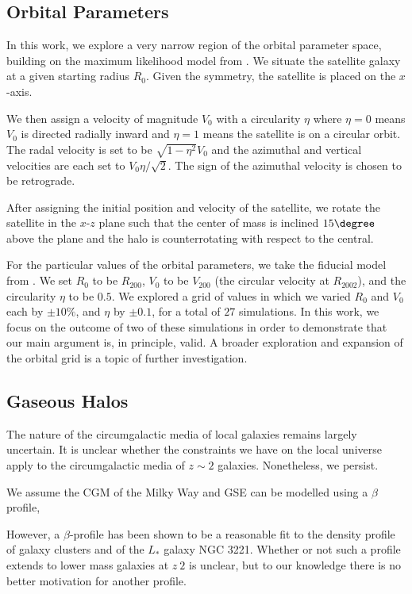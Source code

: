 \subsection{Orbital Parameters}\label{ssec:orbits}
In this work, we explore a very narrow region of the orbital parameter space, building on the maximum likelihood model from \citet{2021ApJ...923...92N}. We situate the satellite galaxy at a given starting radius $R_0$. Given the symmetry, the satellite is placed on the $x$-axis. 

We then assign a velocity of magnitude $V_0$ with a circularity $\eta$ where $\eta=0$ means $V_0$ is directed radially inward and $\eta=1$ means the satellite is on a circular orbit. The radal velocity is set to be $\sqrt{1-\eta^2}V_0$ and the azimuthal and vertical velocities are each set to $V_0 \eta / \sqrt{2}$. The sign of the azimuthal velocity is chosen to be retrograde.

After assigning the initial position and velocity of the satellite, we rotate the satellite in the $x$-$z$ plane such that the center of mass is inclined $15\degree$ above the plane and the halo is counterrotating with respect to the central.

For the particular values of the orbital parameters, we take the fiducial model from \citet{2021ApJ...923...92N}. We set $R_0$ to be $R_{200}$, $V_0$ to be $V_{200}$ (the circular velocity at $R_{2002}$), and the circularity $\eta$ to be $0.5$. We explored a grid of values in which we varied $R_0$ and $V_0$ each by $\pm10\%$, and $\eta$ by $\pm0.1$, for a total of $27$ simulations. In this work, we focus on the outcome of two of these simulations in order to demonstrate that our main argument is, in principle, valid. A broader exploration and expansion of the orbital grid is a topic of further investigation.

\subsection{Gaseous Halos}\label{ssec:gashalo}

The nature of the circumgalactic media of local galaxies remains largely
uncertain. It is unclear whether the constraints we have on the local universe
apply to the circumgalactic media of $z\sim2$ galaxies. Nonetheless, we persist.

We assume the CGM of the Milky Way and GSE can be modelled using a $\beta$ profile,

However, a $\beta$-profile has been shown to be a reasonable fit to the density
profile of galaxy clusters and of the $L_{*}$ galaxy NGC 3221. Whether or not
such a profile extends to lower mass galaxies at $z~2$ is unclear, but to our
knowledge there is no better motivation for another profile.

